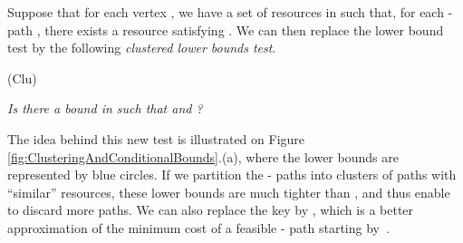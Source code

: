 \documentclass[11pt]{amsart}
\theoremstyle{plain}
\theoremstyle{remark}
\begin{document}
Suppose that for each vertex , we have a set  of resources in  such that, for each - path , there exists a resource  satisfying . We can then replace the lower bound test by the following \emph{clustered lower bounds test}.

\smallskip
	(Clu) \begin{minipage}{\dimexpr\textwidth-2cm} \emph{Is there a bound  in  such that  and ?}
\end{minipage}
\smallskip

\noindent The idea behind this new test is illustrated on Figure \ref{fig:ClusteringAndConditionalBounds}.(a), where the lower bounds  are represented by blue circles. If we partition the - paths into clusters of paths with ``similar'' resources, these lower bounds  are much tighter than , and thus enable to discard more paths. We can also replace the key  by , which is a better approximation of the minimum cost of a feasible - path starting by~.
\end{document}
